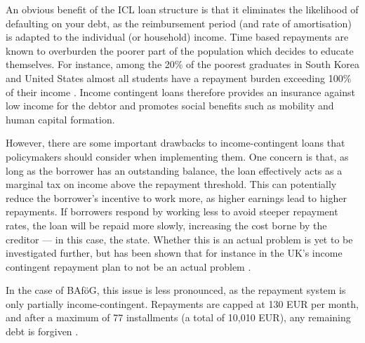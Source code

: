 An obvious benefit of the ICL loan structure is that it eliminates the likelihood 
of defaulting on your debt, as the reimbursement period 
(and rate of amortisation) is adapted to the individual (or household) income. 
Time based repayments are known to overburden the poorer part of the population which decides to 
educate themselves. For instance, among the 20\% of the poorest graduates in South Korea and United States 
almost all students have a repayment burden exceeding 100\% of their income 
\citep{chapman_income-contingent_2022}. 
Income contingent loans therefore provides an insurance against low income for the debtor and promotes social benefits such as mobility and human capital formation.

However, there are some important drawbacks to income-contingent loans that policymakers should consider when implementing them. 
One concern is that, as long as the borrower has an outstanding balance, the loan effectively acts as a marginal tax on income above the repayment threshold. 
This can potentially reduce the borrower’s incentive to work more, as higher earnings lead to higher repayments. 
If borrowers respond by working less to avoid steeper repayment rates, the loan will be repaid more slowly, increasing the cost borne by the creditor — in this case, the state.
Whether this is an actual problem is yet to be investigated further, but has been
shown that for instance in the UK's income contingent repayment plan to not 
be an actual problem \citep{britton_income_2020}. 

In the case of BAföG, this issue is less pronounced, as the repayment system is only partially income-contingent. Repayments are capped at 130 EUR per month, and after a maximum of 77 installments (a total of 10,010 EUR), any remaining debt is forgiven \citep{studentenwerk_bafog}.





